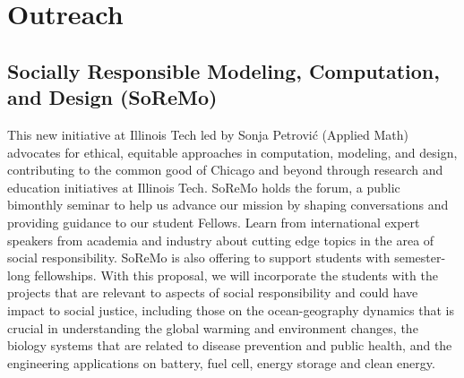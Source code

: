 \documentclass[11pt]{NSFamsart}
\newcommand{\FredNote}[1]{{\color{blue} Fred: #1}}
\begin{document}
 




\section{Outreach}

\subsection*{Socially Responsible Modeling, Computation, and Design
(SoReMo)}
This new initiative at Illinois Tech led by Sonja Petrovi\'c (Applied Math) advocates for ethical, equitable approaches in computation,
modeling, and design, contributing to the common good of Chicago and
beyond through research and education initiatives at Illinois Tech.
SoReMo holds the forum,  a public bimonthly seminar to help us advance
our mission by shaping conversations and providing guidance to our
student Fellows. Learn from international expert speakers from academia
and industry about cutting edge topics in the area of social responsibility.
SoReMo is also offering to support students with semester-long fellowships.   
With this proposal, we will incorporate the students with the projects that are relevant to aspects of social responsibility and could have impact to social justice, including those on the ocean-geography dynamics that is crucial in understanding the global warming and environment changes, the biology systems that are related to disease prevention and public health,  and the engineering applications on battery, fuel cell, energy storage and clean energy.
\end{document}
